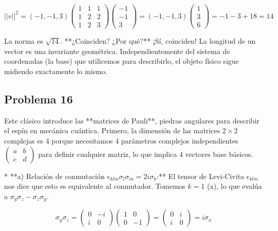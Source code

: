\documentclass[11pt,spanish]{article}
\begin{document}
$$||v||^2 = (-1, -1, 3) \begin{pmatrix} 1 & 1 & 1 \\ 1 & 2 & 2 \\ 1 & 2 & 3 \end{pmatrix} \begin{pmatrix} -1 \\ -1 \\ 3 \end{pmatrix} = (-1, -1, 3) \begin{pmatrix} 1 \\ 3 \\ 6 \end{pmatrix} = -1 - 3 + 18 = 14$$


La norma es $\sqrt{14}$.
**¿Coinciden? ¿Por qué?** ¡Sí, coinciden! La longitud de un vector es una invariante geométrica. Independientemente del sistema de coordenadas (la base) que utilicemos para describirlo, el objeto físico sigue midiendo exactamente lo mismo.




\subsection*{Problema 16}


Este clásico introduce las **matrices de Pauli**, piedras angulares para describir el espín en mecánica cuántica.
Primero, la dimensión de las matrices $2\times2$ complejas es 4 porque necesitamos 4 parámetros complejos independientes $\begin{pmatrix} a & b \\ c & d \end{pmatrix}$ para definir cualquier matriz, lo que implica 4 vectores base básicos.

* **a) Relación de conmutación $\epsilon_{klm}\sigma_{l}\sigma_{m}=2i\sigma_{k}$:**
El tensor de Levi-Civita $\epsilon_{klm}$ nos dice que esto es equivalente al conmutador. Tomemos $k=1$ (x), lo que evalúa a $\sigma_y\sigma_z - \sigma_z\sigma_y$.



$$\sigma_y\sigma_z = \begin{pmatrix}0&-i\\i&0\end{pmatrix}\begin{pmatrix}1&0\\0&-1\end{pmatrix} = \begin{pmatrix}0&i\\i&0\end{pmatrix} = i\sigma_x$$
\end{document}
